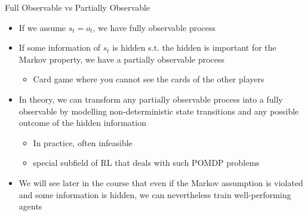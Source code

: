 \documentclass[aspectratio=169]{../latex_main/tntbeamer}  %
\begin{document}
\begin{frame}[c]{Full Observable vs Partially Observable}
	
	\begin{itemize}
		\item If we assume $s_t = o_t$, we have fully observable process
		\pause
		\item If some information of $s_t$ is hidden s.t. the hidden is important for the Markov property, we have a partially observable process
		\begin{itemize}
			\item Card game where you cannot see the cards of the other players
		\end{itemize}
		\pause
		\medskip
		\item In theory, we can transform any partially observable process into a fully observable by modelling non-deterministic state transitions and any possible outcome of the hidden information
		\begin{itemize}
			\item In practice, often infeasible
			\item special subfield of RL that deals with such POMDP problems
		\end{itemize}
		\pause
		\medskip
		\item We will see later in the course that even if the Markov assumption is violated and some information is hidden, we can nevertheless train well-performing agents
	\end{itemize}

\end{frame}
\end{document}
